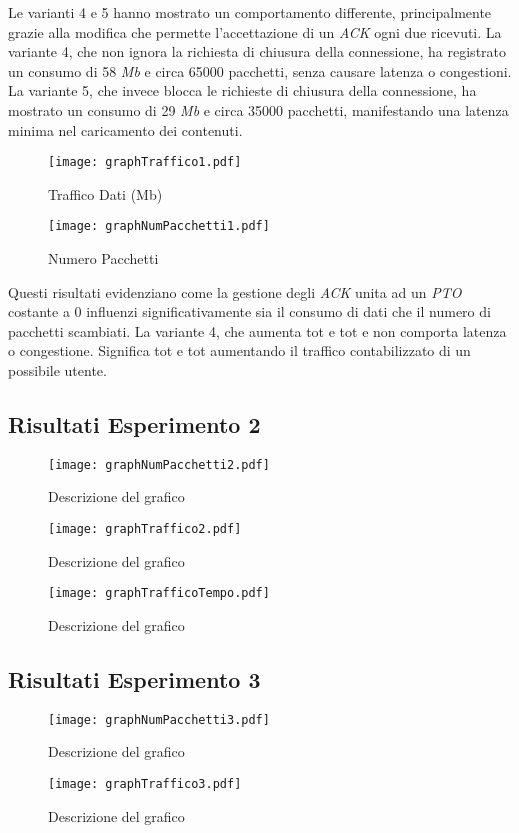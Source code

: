 Le varianti 4 e 5 hanno mostrato un comportamento differente, principalmente grazie alla modifica che permette l'accettazione di un \emph{ACK} ogni due ricevuti.
La variante 4, che non ignora la richiesta di chiusura della connessione, ha registrato un consumo di 58 \emph{Mb} e circa 65000 pacchetti, senza causare latenza o congestioni. 
La variante 5, che invece blocca le richieste di chiusura della connessione, ha mostrato un consumo di 29 \emph{Mb} e circa 35000 pacchetti, manifestando una latenza minima nel caricamento dei contenuti.
\begin{figure}[h!]
    \centering
    \texttt{[image: graphTraffico1.pdf]}
    \caption{Traffico Dati (Mb)}
    \label{grafico12}
\end{figure}

\begin{figure}[h!]
    \centering
    \texttt{[image: graphNumPacchetti1.pdf]}
    \caption{Numero Pacchetti}
    \label{grafico1}
\end{figure}

\noindent Questi risultati evidenziano come la gestione degli \emph{ACK} unita ad un \emph{PTO} costante a 0 influenzi significativamente sia il consumo di dati che il numero di pacchetti scambiati.
La variante 4, che aumenta tot e tot e non comporta latenza o congestione. Significa tot e tot aumentando il traffico contabilizzato di un possibile utente. 
\subsection{Risultati Esperimento 2}
\begin{figure}[h!]
    \centering
    \texttt{[image: graphNumPacchetti2.pdf]}
    \caption{Descrizione del grafico}
    \label{grafico2}
\end{figure}
\begin{figure}[h!]
    \centering
    \texttt{[image: graphTraffico2.pdf]}
    \caption{Descrizione del grafico}
    \label{grafico22}
\end{figure}
\begin{figure}[h!]
    \centering
    \texttt{[image: graphTrafficoTempo.pdf]}
    \caption{Descrizione del grafico}
    \label{grafico23}
\end{figure}
\subsection{Risultati Esperimento 3}
\begin{figure}[h!]
    \centering
    \texttt{[image: graphNumPacchetti3.pdf]}
    \caption{Descrizione del grafico}
    \label{grafico3}
\end{figure}
\begin{figure}[h!]
    \centering
    \texttt{[image: graphTraffico3.pdf]}
    \caption{Descrizione del grafico}
    \label{grafico32}
\end{figure}
